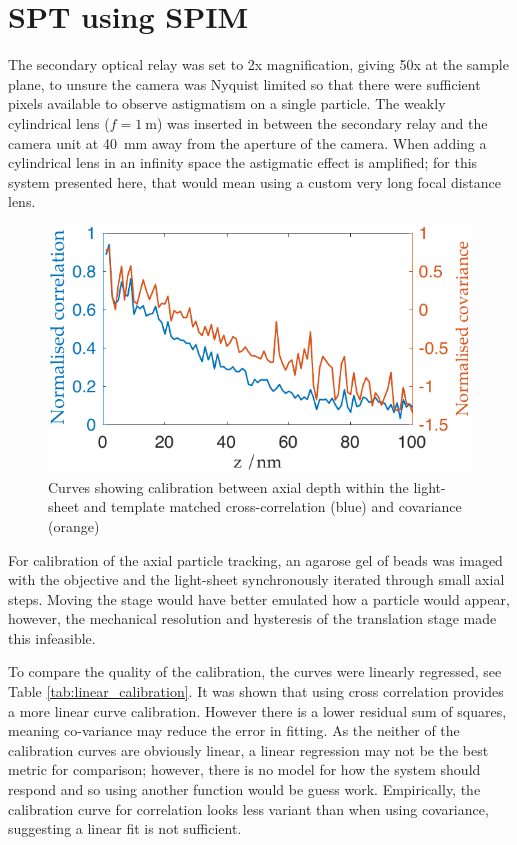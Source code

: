 \section{SPT using SPIM}

The secondary optical relay was set to 2x magnification, giving 50x at the sample plane, to unsure the camera was Nyquist limited so that there were sufficient pixels available to observe astigmatism on a single particle.
The weakly cylindrical lens ($f = \SI{1}{\metre}$) was inserted in between the secondary relay and the camera unit at \SI{40}{\milli\metre} away from the aperture of the camera.
When adding a cylindrical lens in an infinity space the astigmatic effect is amplified; for this system presented here, that would mean using a custom very long focal distance lens. %

\begin{figure}[h]
  \centering
  \includegraphics{./calibration/Calibration.pdf}
  \caption{Curves showing calibration between axial depth within the light-sheet and template matched cross-correlation (blue) and covariance (orange)}
  \label{fig:SPT_Calibration}
\end{figure}

For calibration of the axial particle tracking, an agarose gel of beads was imaged with the objective and the light-sheet synchronously iterated through small axial steps.
Moving the stage would have better emulated how a particle would appear, however, the mechanical resolution and hysteresis of the translation stage made this infeasible.

To compare the quality of the calibration, %
the curves were linearly regressed, see Table \ref{tab:linear_calibration}.
It was shown that using cross correlation provides a more linear curve calibration.
However there is a lower residual sum of squares, meaning co-variance may reduce the error in fitting. %
As the neither of the calibration curves are obviously linear, a linear regression may not be the best metric for comparison; however, there is no model for how the system should respond and so using another function would be guess work.
Empirically, the calibration curve for correlation looks less variant than when using covariance, suggesting a linear fit is not sufficient.

